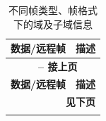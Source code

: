\begin{longtable}[c]{|p{3.5cm}|p{12cm}|} 
    
  \caption{不同帧类型、帧格式下的域及子域信息}
  \label{tab:twai-data-frames-and-remote-frames} 
  \\\hline
  \rowcolor{lightgray}
  \textbf{数据/远程帧} & \textbf{描述}
  \\\hline
  \endfirsthead
  
  \multicolumn{2}{c}{\bfseries \tablename\ \thetable{} -- 接上页}\\  \hline
  
  \rowcolor{lightgray}
    \textbf{数据/远程帧} & \textbf{描述}
  \\\hline
  \endhead
  
  \multicolumn{2}{r}{\textbf{见下页}} \\
  \endfoot
  \endlastfoot
  

\end{longtable}
